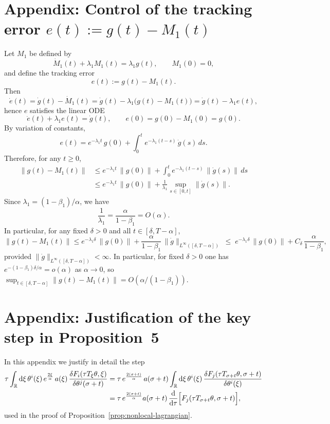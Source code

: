 \documentclass{article} %
\begin{document}
\section{Appendix: Control of the tracking error $e(t):=g(t)-M_1(t)$}\label{app:tracking-error}
Let $M_1$ be defined by
\[
\dot M_1(t)+\lambda_1 M_1(t)=\lambda_1 g(t),
\qquad M_1(0)=0,
\]
and define the tracking error
\[
e(t):=g(t)-M_1(t).
\]
Then
\[
\dot e(t)=\dot g(t)-\dot M_1(t)
=\dot g(t)-\lambda_1\big(g(t)-M_1(t)\big)
=\dot g(t)-\lambda_1 e(t),
\]
hence $e$ satisfies the linear ODE
\[
\dot e(t)+\lambda_1 e(t)=\dot g(t),
\qquad e(0)=g(0)-M_1(0)=g(0).
\]
By variation of constants,
\[
e(t)=e^{-\lambda_1 t}\,g(0)+\int_0^t e^{-\lambda_1 (t-s)}\,\dot g(s)\,ds.
\]
Therefore, for any $t\ge 0$,
\[
\begin{aligned}
\|g(t)-M_1(t)\|
&
\le e^{-\lambda_1 t}\,\|g(0)\|
+\int_0^t e^{-\lambda_1 (t-s)}\,\|\dot g(s)\|\,ds\\
&\le e^{-\lambda_1 t}\,\|g(0)\|
+\frac{1}{\lambda_1}\sup_{s\in[0,t]}\|\dot g(s)\|. 
\end{aligned}
\]
Since $\lambda_1=(1-\beta_1)/\alpha$, we have
\[
\frac{1}{\lambda_1}=\frac{\alpha}{1-\beta_1}=O(\alpha).
\]
In particular, for any fixed $\delta>0$ and all $t\in[\delta,T-\alpha]$,
\[
\|g(t)-M_1(t)\|
\le e^{-\lambda_1\delta}\,\|g(0)\|
+\frac{\alpha}{1-\beta_1}\,\|\dot g\|_{L^\infty([\delta,T-\alpha])}
\;\le\; e^{-\lambda_1\delta}\,\|g(0)\|+C_\delta\,\frac{\alpha}{1-\beta_1},
\]
provided $\|\dot g\|_{L^\infty([\delta,T-\alpha])}<\infty$. In particular, for fixed $\delta>0$ one has $e^{-(1-\beta_1)\delta/\alpha}=o(\alpha)$ as $\alpha\to 0$, so $\sup_{t\in[\delta,T-\alpha]}\|g(t)-M_1(t)\|=O(\alpha/(1-\beta_1))$.


\section{Appendix: Justification of the key step in Proposition~5}\label{App:Prop5}

In this appendix we justify in detail the step
\begin{align*}
 \tau \int_{\mathbb{R}} \mathrm{d}\xi \,
 \theta^i(\xi)\,e^{\frac{2\xi}{\alpha}}\,a(\xi)\,
 \frac{\delta F_i(\tau T_\xi\theta, \xi)}{\delta \theta^j(\sigma + t)}
 &=
 \tau\,e^{\frac{2(\sigma + t)}{\alpha}}\,a(\sigma + t)
 \int_{\mathbb{R}} \mathrm{d}\xi \,
 \theta^i(\xi)\,
 \frac{\delta F_j(\tau T_{\sigma + t} \theta,\sigma+t)}{\delta \theta^i(\xi)} \\
 &= \tau\,e^{\frac{2(\sigma + t)}{\alpha}} a(\sigma + t)\,
 \frac{\mathrm{d}}{\mathrm{d}\tau}
 \Bigl[F_j(\tau T_{\sigma + t}\theta, \sigma + t)\Bigr],
\end{align*}
used in the proof of Proposition~\ref{prop:nonlocal-lagrangian}.
\end{document}
